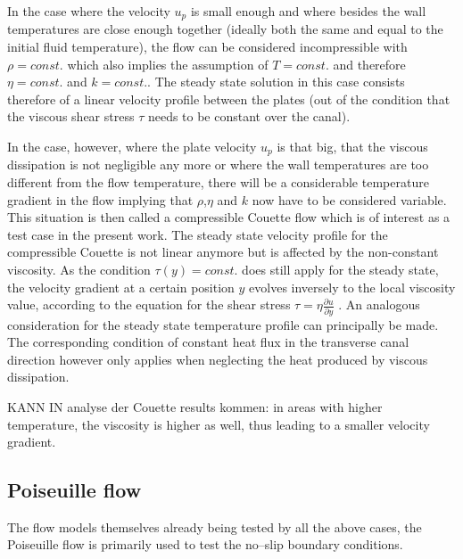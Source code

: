 \documentclass{report}
\begin{document}
In the case where the velocity $u_p$ is small enough and where besides the wall temperatures are close enough together (ideally both the same and equal to the initial fluid temperature), the flow can be considered incompressible with $\rho=const.$ which also implies the assumption of $T=const$. and therefore $\eta=const.$ and $k=const.$. The steady state solution in this case consists therefore of a linear velocity profile between the plates (out of the condition that the viscous shear stress $\tau$ needs to be constant over the canal).

In the case, however, where the plate velocity $u_p$ is that big, that the viscous dissipation is not negligible any more or where the wall temperatures are too different from the flow temperature, there will be a considerable temperature gradient in the flow implying that $\rho$,$\eta$ and $k$ now have to be considered variable. This situation is then called a compressible Couette flow which is of interest as a test case in the present work.
The steady state velocity profile for the compressible Couette is not linear anymore but is affected by the non-constant viscosity. As the condition $\tau(y)=const.$ does still apply for the steady state, the velocity gradient at a certain position $y$ evolves inversely to the local viscosity value, according to the equation for the shear stress $\tau=\eta \frac{\partial u}{\partial y}$ \cite{Anderson2001}. 
An analogous consideration for the steady state temperature profile can principally be made. The corresponding condition of constant heat flux in the transverse canal direction however only applies when neglecting the heat produced by viscous dissipation. 







KANN IN analyse der Couette results kommen: in areas with higher temperature, the viscosity is higher as well, thus leading to a smaller velocity gradient.


\subsection{Poiseuille flow}
\label{sec:genIntroPoiseuille}
 The flow models themselves already being tested by all the above cases, the Poiseuille flow is primarily used to test the no--slip boundary conditions. 
\end{document}
